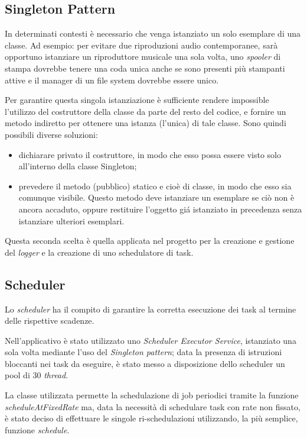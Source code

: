 \vspace*{0.5cm}
\subsection{Singleton Pattern}
In determinati contesti \`e necessario che venga istanziato un solo esemplare di una classe. Ad esempio: per evitare due riproduzioni audio contemporanee, sar\`{a} opportuno istanziare un riproduttore musicale una sola volta,
uno \textit{spooler} di stampa dovrebbe tenere una coda unica anche se sono presenti pi\`{u} stampanti attive e
il manager di un file system dovrebbe essere unico.

Per garantire questa singola istanziazione \`{e} sufficiente rendere impossible l'utilizzo del costruttore della classe da parte del resto del codice, e fornire un metodo indiretto per ottenere una istanza (l'unica) di tale classe.
Sono quindi possibili diverse soluzioni:
\begin{itemize}
\item dichiarare privato il costruttore, in modo che esso possa essere visto solo all'interno della classe Singleton;
\item prevedere il metodo (pubblico) statico e cio\`e di classe, in modo che esso sia comunque visibile. Questo metodo deve istanziare un esemplare se ci\`o non \`e ancora accaduto, oppure restituire l'oggetto gi\'a istanziato in precedenza senza istanziare ulteriori esemplari.
\end{itemize}
Questa seconda scelta \`e quella applicata nel progetto per la creazione e gestione del \textit{logger} e la creazione di uno schedulatore di task.

\vspace*{0.5cm}
\subsection{Scheduler}
Lo \textit{scheduler} ha il compito di garantire la corretta esecuzione dei task al termine delle rispettive scadenze.

Nell'applicativo \`{e} stato utilizzato uno \textit{Scheduler Executor Service}, istanziato una sola volta mediante l'uso del \textit{Singleton pattern}; data la presenza di istruzioni bloccanti nei task da eseguire, \`{e} stato messo a disposizione dello scheduler un pool di $30$ \textit{thread}.

La classe utilizzata permette la schedulazione di job periodici tramite la funzione \textit{scheduleAtFixedRate} ma, data la necessit\`{a} di schedulare task con rate non fissato, \`{e} stato deciso di effettuare le singole ri-schedulazioni utilizzando, la pi\`{u} semplice, funzione \textit{schedule}.


